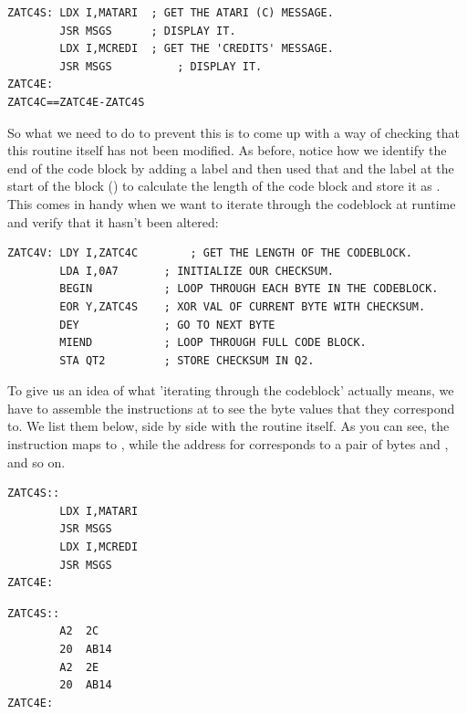 \begin{lstlisting}
ZATC4S: LDX I,MATARI  ; GET THE ATARI (C) MESSAGE.
        JSR MSGS      ; DISPLAY IT.
        LDX I,MCREDI  ; GET THE 'CREDITS' MESSAGE.
        JSR MSGS		  ; DISPLAY IT.
ZATC4E:
ZATC4C==ZATC4E-ZATC4S
\end{lstlisting}
So what we need to do to prevent this is to come up with a way of checking that this routine
itself has not been modified.
As before, notice how we identify the end of the code block by adding a label 
and then used that and the label at the start of the block () to calculate
the length of the code block and store it as .
This comes in handy when we want to iterate through
the codeblock at runtime and verify that it hasn't been altered:
\begin{lstlisting}
ZATC4V: LDY I,ZATC4C		; GET THE LENGTH OF THE CODEBLOCK.
        LDA I,0A7       ; INITIALIZE OUR CHECKSUM. 
        BEGIN           ; LOOP THROUGH EACH BYTE IN THE CODEBLOCK.
        EOR Y,ZATC4S    ; XOR VAL OF CURRENT BYTE WITH CHECKSUM.
        DEY             ; GO TO NEXT BYTE
        MIEND           ; LOOP THROUGH FULL CODE BLOCK.
        STA QT2         ; STORE CHECKSUM IN Q2.
\end{lstlisting}

To give us an idea of what 'iterating through the codeblock' actually means, we have
to assemble the instructions at  to see the byte values that they 
correspond to. We list them below, side by side with the routine itself. As you can
see, the  instruction maps to , while the address for 
corresponds to a pair of bytes  and , and so on.

\begin{minipage}[c]{0.40\linewidth}
\begin{lstlisting}[basicstyle=\scriptsize\ttfamily]
ZATC4S::                                         
        LDX I,MATARI             
        JSR MSGS                  
        LDX I,MCREDI             
        JSR MSGS                  
ZATC4E:                                                                       
\end{lstlisting}
\end{minipage}
\hspace{0.5cm}
\begin{minipage}[c]{0.40\linewidth}
\begin{lstlisting}[basicstyle=\scriptsize\ttfamily]
ZATC4S::                                         
        A2  2C
        20  AB14
        A2  2E
        20  AB14
ZATC4E:                                                                       
\end{lstlisting}
\vspace*{\fill}
\end{minipage}

